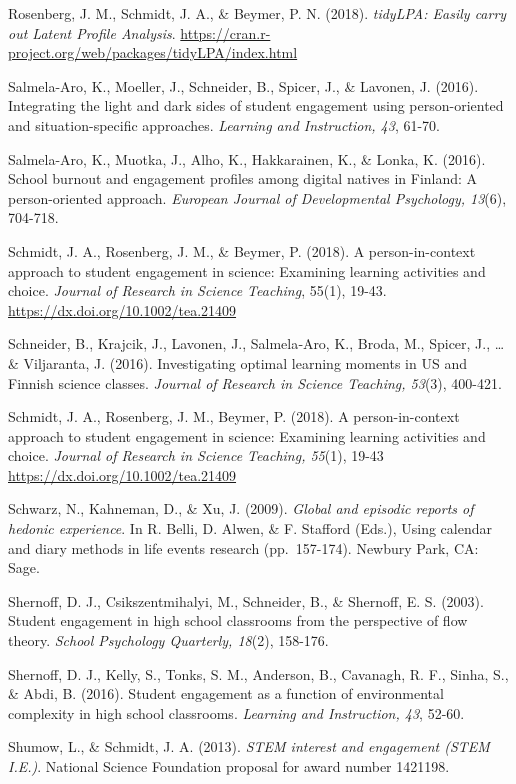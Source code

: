 \documentclass[]{book}
\theoremstyle{definition}
\theoremstyle{definition}
\theoremstyle{definition}
\theoremstyle{remark}
\begin{document}
Rosenberg, J. M., Schmidt, J. A., \& Beymer, P. N. (2018).
\emph{tidyLPA: Easily carry out Latent Profile Analysis}.
\url{https://cran.r-project.org/web/packages/tidyLPA/index.html}

Salmela-Aro, K., Moeller, J., Schneider, B., Spicer, J., \& Lavonen, J.
(2016). Integrating the light and dark sides of student engagement using
person-oriented and situation-specific approaches. \emph{Learning and
Instruction, 43}, 61-70.

Salmela-Aro, K., Muotka, J., Alho, K., Hakkarainen, K., \& Lonka, K.
(2016). School burnout and engagement profiles among digital natives in
Finland: A person-oriented approach. \emph{European Journal of
Developmental Psychology, 13}(6), 704-718.

Schmidt, J. A., Rosenberg, J. M., \& Beymer, P. (2018). A
person-in-context approach to student engagement in science: Examining
learning activities and choice. \emph{Journal of Research in Science
Teaching}, 55(1), 19-43. \url{https://dx.doi.org/10.1002/tea.21409}

Schneider, B., Krajcik, J., Lavonen, J., Salmela‐Aro, K., Broda, M.,
Spicer, J., \ldots{} \& Viljaranta, J. (2016). Investigating optimal
learning moments in US and Finnish science classes. \emph{Journal of
Research in Science Teaching, 53}(3), 400-421.

Schmidt, J. A., Rosenberg, J. M., Beymer, P. (2018). A person-in-context
approach to student engagement in science: Examining learning activities
and choice. \emph{Journal of Research in Science Teaching, 55}(1), 19-43
\url{https://dx.doi.org/10.1002/tea.21409}

Schwarz, N., Kahneman, D., \& Xu, J. (2009). \emph{Global and episodic
reports of hedonic experience}. In R. Belli, D. Alwen, \& F. Stafford
(Eds.), Using calendar and diary methods in life events research
(pp.~157-174). Newbury Park, CA: Sage.

Shernoff, D. J., Csikszentmihalyi, M., Schneider, B., \& Shernoff, E. S.
(2003). Student engagement in high school classrooms from the
perspective of flow theory. \emph{School Psychology Quarterly, 18}(2),
158-176.

Shernoff, D. J., Kelly, S., Tonks, S. M., Anderson, B., Cavanagh, R. F.,
Sinha, S., \& Abdi, B. (2016). Student engagement as a function of
environmental complexity in high school classrooms. \emph{Learning and
Instruction, 43}, 52-60.

Shumow, L., \& Schmidt, J. A. (2013). \emph{STEM interest and engagement
(STEM I.E.)}. National Science Foundation proposal for award number
1421198.
\end{document}
